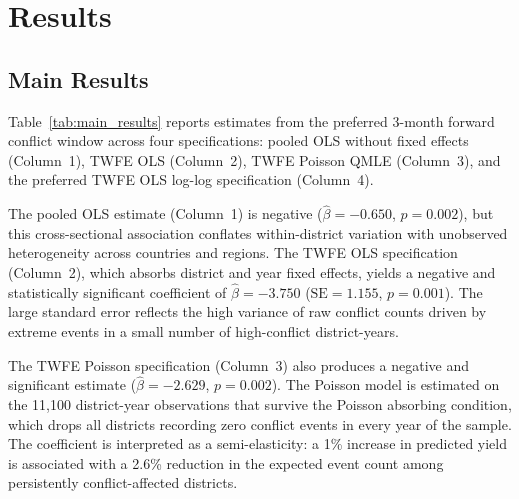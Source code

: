 \section{Results}
\label{sec:results}

\subsection{Main Results}

Table~\ref{tab:main_results} reports estimates from the preferred 3-month forward conflict window across four specifications: pooled OLS without fixed effects (Column~1), TWFE OLS (Column~2), TWFE Poisson QMLE (Column~3), and the preferred TWFE OLS log-log specification (Column~4).

\begin{table}[H]
\centering
\caption{Effect of Predicted Maize Yield on Conflict: Main Results (3-Month Window)}
\label{tab:main_results}
\begin{threeparttable}

\end{threeparttable}
\end{table}

The pooled OLS estimate (Column~1) is negative ($\hat{\beta} = -0.650$, $p = 0.002$), but this cross-sectional association conflates within-district variation with unobserved heterogeneity across countries and regions. The TWFE OLS specification (Column~2), which absorbs district and year fixed effects, yields a negative and statistically significant coefficient of $\hat{\beta} = -3.750$ ($\text{SE} = 1.155$, $p = 0.001$). The large standard error reflects the high variance of raw conflict counts driven by extreme events in a small number of high-conflict district-years.

The TWFE Poisson specification (Column~3) also produces a negative and significant estimate ($\hat{\beta} = -2.629$, $p = 0.002$). The Poisson model is estimated on the 11,100 district-year observations that survive the Poisson absorbing condition, which drops all districts recording zero conflict events in every year of the sample. The coefficient is interpreted as a semi-elasticity: a 1\% increase in predicted yield is associated with a 2.6\% reduction in the expected event count among persistently conflict-affected districts.


